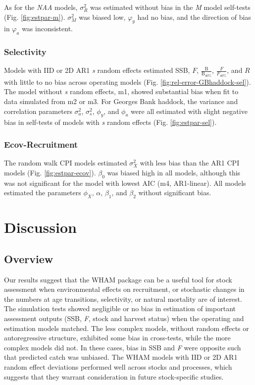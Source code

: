 \documentclass[]{article}
\begin{document}
As for the \emph{NAA} models, \(\sigma^2_R\) was estimated without bias
in the \emph{M} model self-tests (Fig. \ref{fig:estpar-m}).
\(\sigma^2_M\) was biased low, \(\varphi_y\) had no bias, and the
direction of bias in \(\varphi_a\) was inconsistent.

\hypertarget{selectivity}{%
\subsubsection{Selectivity}\label{selectivity}}

Models with IID or 2D AR1 \emph{s} random effects estimated SSB, \(F\),
\(\frac{\text{B}}{\text{B}_{40\%}}\), \(\frac{F}{F_{40\%}}\), and \(R\)
with little to no bias across operating models (Fig.
\ref{fig:rel-error-GBhaddock-sel}). The model without \emph{s} random
effects, m1, showed substantial bias when fit to data simulated from m2
or m3. For Georges Bank haddock, the variance and correlation parameters
\(\sigma^2_a\), \(\sigma^2_s\), \(\phi_y\), and \(\phi_a\) were all
estimated with slight negative bias in self-tests of models with
\emph{s} random effects (Fig. \ref{fig:estpar-sel}).

\hypertarget{ecov-recruitment}{%
\subsubsection{Ecov-Recruitment}\label{ecov-recruitment}}

The random walk CPI models estimated \(\sigma^2_X\) with less bias than
the AR1 CPI models (Fig. \ref{fig:estpar-ecov}). \(\beta_0\) was biased
high in all models, although this was not significant for the model with
lowest AIC (m4, AR1-linear). All models estimated the parameters
\(\phi_X\), \(\alpha\), \(\beta_1\), and \(\beta_2\) without significant
bias.

\hypertarget{discussion}{%
\section{Discussion}\label{discussion}}

\hypertarget{overview}{%
\subsection{Overview}\label{overview}}

Our results suggest that the WHAM package can be a useful tool for stock
assessment when environmental effects on recruitment, or stochastic
changes in the numbers at age transitions, selectivity, or natural
mortality are of interest. The simulation tests showed negligible or no
bias in estimation of important assessment outputs (SSB, \emph{F}, stock
and harvest status) when the operating and estimation models matched.
The less complex models, without random effects or autoregressive
structure, exhibited some bias in cross-tests, while the more complex
models did not. In these cases, bias in SSB and \emph{F} were opposite
such that predicted catch was unbiased. The WHAM models with IID or 2D
AR1 random effect deviations performed well across stocks and processes,
which suggests that they warrant consideration in future stock-specific
studies.
\end{document}
